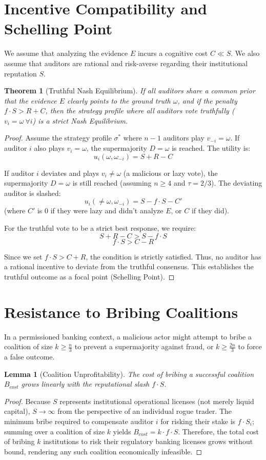 \documentclass[11pt,a4paper]{article}
\newtheorem{theorem}{Theorem}
\newtheorem{lemma}{Lemma}
\begin{document}
\section{Incentive Compatibility and Schelling Point}
We assume that analyzing the evidence $E$ incurs a cognitive cost $C \ll S$. We also assume that auditors are rational and risk-averse regarding their institutional reputation $S$.

\begin{theorem}[Truthful Nash Equilibrium]
If all auditors share a common prior that the evidence $E$ clearly points to the ground truth $\omega$, and if the penalty $f \cdot S > R + C$, then the strategy profile where all auditors vote truthfully ($v_i = \omega \ \forall i$) is a strict Nash Equilibrium.
\end{theorem}
\begin{proof}
Assume the strategy profile $\sigma^*$ where $n-1$ auditors play $v_{-i} = \omega$.
If auditor $i$ also plays $v_i = \omega$, the supermajority $D = \omega$ is reached.
The utility is:
\[ u_i(\omega, \omega_{-i}) = S + R - C \]

If auditor $i$ deviates and plays $v_i \neq \omega$ (a malicious or lazy vote), the supermajority $D = \omega$ is still reached (assuming $n \geq 4$ and $\tau = 2/3$). The deviating auditor is slashed:
\[ u_i(\neq \omega, \omega_{-i}) = S - f \cdot S - C' \]
(where $C'$ is $0$ if they were lazy and didn't analyze $E$, or $C$ if they did).

For the truthful vote to be a strict best response, we require:
\[ S + R - C > S - f \cdot S \]
\[ f \cdot S > C - R \]

Since we set $f \cdot S > C + R$, the condition is strictly satisfied. Thus, no auditor has a rational incentive to deviate from the truthful consensus. This establishes the truthful outcome as a focal point (Schelling Point).
\end{proof}

\section{Resistance to Bribing Coalitions}
In a permissioned banking context, a malicious actor might attempt to bribe a coalition of size $k \geq \frac{n}{3}$ to prevent a supermajority against fraud, or $k \geq \frac{2n}{3}$ to force a false outcome.

\begin{lemma}[Coalition Unprofitability]
The cost of bribing a successful coalition $B_{cost}$ grows linearly with the reputational slash $f \cdot S$.
\end{lemma}
\begin{proof}
Because $S$ represents institutional operational licenses (not merely liquid capital), $S \to \infty$ from the perspective of an individual rogue trader. The minimum bribe required to compensate auditor $i$ for risking their stake is $f \cdot S_i$; summing over a coalition of size $k$ yields $B_{cost} = k \cdot f \cdot S$. Therefore, the total cost of bribing $k$ institutions to risk their regulatory banking licenses grows without bound, rendering any such coalition economically infeasible.
\end{proof}
\end{document}
